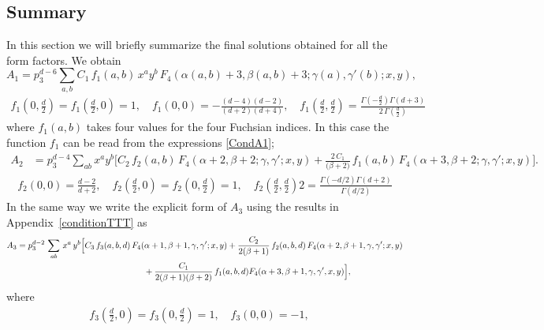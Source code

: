 \documentclass[a4paper,11pt,openright,twoside]{book}
\let\a=\alpha   \let\b=\beta   \let\g=\gamma   \let\d=\delta
\newcommand{\appref}[1]{Appendix~\ref{#1}}		%
\numberwithin{equation}{section}
\begin{document}
{{\subsection{Summary}
In this section we will briefly summarize the final solutions obtained for all the form factors. 
We obtain \\
\begin{equation}
A_1=p_3^{d - 6}\sum_{a,b} C_1\,f_1(a,b)\,x^a y^b \,F_4(\alpha(a,b) +3, \beta(a,b)+3; \gamma(a), \gamma'(b); x, y),
\end{equation}
\begin{align}
f_1\left(0,\frac{d}{2}\right)=f_1\left(\frac{d}{2},0\right)=1,\quad
f_1(0,0)=-\frac{(d-4) (d-2)}{(d+2) (d+4)},\quad
f_1\left(\frac{d}{2},\frac{d}{2}\right)=\frac{\Gamma\left(-\frac{d}{2}\right)\Gamma\left(d+3\right)}{2\,\Gamma\left(\frac{d}{2}\right)}
\label{CondA2}
\end{align}
where $f_1(a,b)$ takes four values for the four Fuchsian indices. In this case the function $f_1$ can be read from the expressions \eqref{CondA1};
\begin{align}
A_2&= p_3^{d - 4}\sum_{a b} x^a y^b\bigg[C_2\,f_2(a,b)\,F_4(\alpha +2, \beta+2; \gamma, \gamma'; x, y)+ \frac{2\,C_1}{\big(\b+2\big)}\,f_1(a,b)\,F_4(\alpha +3, \beta+2; \gamma, \gamma'; x, y)\bigg].
\end{align}
\begin{align} 
f_2\left(0,0\right)=\frac{d-2}{d+2},\quad f_2\left(\frac{d}{2},0\right)=f_2\left(0,\frac{d}{2}\right)=1,\quad
f_2\left(\frac{d}{2},\frac{d}{2}\right)2=\frac{\Gamma(-d/2)\Gamma(d+2)}{\Gamma(d/2)}
\end{align}
In the same way we write the explicit form of $A_3$ using the results in \appref{conditionTTT} as
\begin{align}
A_3&=p_3^{d-2}\,\sum_{ab}\,x^a\,y^b\Big[C_3\,f_3(a,b,d)\,F_4(\a+1,\b+1,\g,\g';x,y)+\frac{C_2}{2(\b+1)}\,f_2(a,b,d)\,F_4(\a+2,\b+1,\g,\g';x,y)\notag\\
&\hspace{5.3cm}+\frac{C_1}{2(\b+1)(\b+2)}\,f_1(a,b,d)F_4(\alpha+3,\beta+1,\gamma,\gamma',x,y)
\Big],
\end{align}
where 
\begin{align} 
f_3\left(\frac{d}{2},0\right)=f_3\left(0,\frac{d}{2}\right)=1,\quad f_3\left(0,0\right)=-1,\quad 

\end{align}}}
\end{document}
